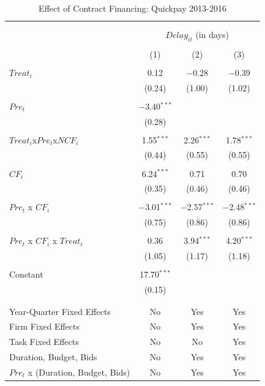 \documentclass[
]{article}
\begin{document}
\begin{table}[H] \centering 
  \caption{Effect of Contract Financing: Quickpay 2013-2016} 
  \label{} 
\small 
\begin{tabular}{@{\extracolsep{-2pt}}lccc} 
\\[-1.8ex]\hline 
\hline \\[-1.8ex] 
\\[-1.8ex] & \multicolumn{3}{c}{$Delay_{it}$ (in days)} \\ 
\\[-1.8ex] & (1) & (2) & (3)\\ 
\hline \\[-1.8ex] 
 $Treat_i$ & 0.12 & $-$0.28 & $-$0.39 \\ 
  & (0.24) & (1.00) & (1.02) \\ 
  & & & \\ 
 $Pre_t$ & $-$3.40$^{***}$ &  &  \\ 
  & (0.28) &  &  \\ 
  & & & \\ 
 $Treat_i$x$Pre_t$x$NCF_i$ & 1.55$^{***}$ & 2.26$^{***}$ & 1.78$^{***}$ \\ 
  & (0.44) & (0.55) & (0.55) \\ 
  & & & \\ 
 $CF_i$ & 6.24$^{***}$ & 0.71 & 0.70 \\ 
  & (0.35) & (0.46) & (0.46) \\ 
  & & & \\ 
 $Pre_t$ x $CF_i$ & $-$3.01$^{***}$ & $-$2.57$^{***}$ & $-$2.48$^{***}$ \\ 
  & (0.75) & (0.86) & (0.86) \\ 
  & & & \\ 
 $Pre_t$ x $CF_i$ x $Treat_i$ & 0.36 & 3.94$^{***}$ & 4.20$^{***}$ \\ 
  & (1.05) & (1.17) & (1.18) \\ 
  & & & \\ 
 Constant & 17.70$^{***}$ &  &  \\ 
  & (0.15) &  &  \\ 
  & & & \\ 
\hline \\[-1.8ex] 
Year-Quarter Fixed Effects & No & Yes & Yes \\ 
Firm Fixed Effects & No & Yes & Yes \\ 
Task Fixed Effects & No & No & Yes \\ 
Duration, Budget, Bids & No & Yes & Yes \\ 
$Pre_t$  x  (Duration, Budget, Bids) & No & Yes & Yes \\ 

\end{tabular}
\end{table}
\end{document}
